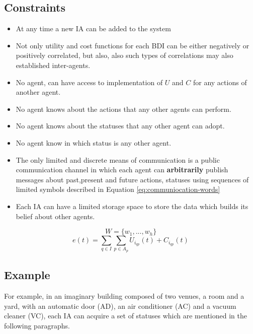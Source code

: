 \documentclass{article}
\begin{document}
\begin{multicols}{2}
		\subsection{Constraints}\label{sec:constraints}
			\begin{itemize}
				\item At any time a new IA can be added to the system 
				\item Not only utility and cost functions for each BDI can be either negatively or positively correlated, but also, also such types of correlations may also established inter-agents. 
				\item No agent, can have access to implementation of $U$ and $C$ for any actions of another agent. 
				\item No agent knows about the actions that any other agents can perform.
				\item No agent knows about the statuses that any other agent can adopt. 
				\item No agent know in which status is any other agent.
				\item The only limited and discrete means of communication is a public communication channel in which each agent can \textbf{arbitrarily} publish messages about past,present and future actions, statuses using sequences of limited symbols described in Equation \ref{eq:communiocation-words}
				\item Each IA can have a limited storage space to store the data which builds its belief about other agents.
			\end{itemize}
			\begin{equation}
				W = \{w_1,...,w_h\}
				\label{eq:communiocation-words}
			\end{equation} 
			\begin{equation}
				e(t) = \sum\limits_{q \in I}\sum\limits_{p \in A_p} {U_{i_{qp}}(t)+C_{i_{qp}}(t)}
				\label{eq:efficiency}
			\end{equation} 
		
		\subsection{Example}
			For example, in an imaginary building composed of two venues, a room and a yard,  with an automatic door (AD), an air conditioner (AC) and a vacuum cleaner (VC), each IA can acquire a set of statuses which are mentioned in the following paragraphs. 

\end{multicols}
\end{document}

